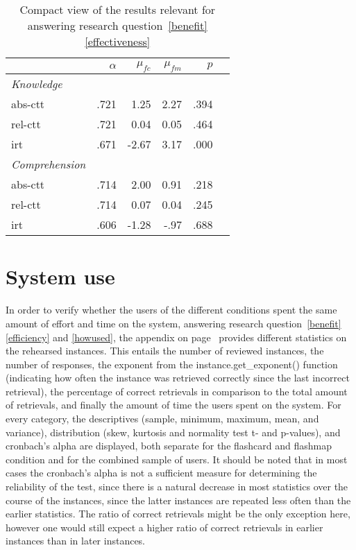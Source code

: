 \begin{table}
    \centering
    \begin{tabular}{lrrrrr}
        \toprule
        & $\alpha$ & $\mu_{fc}$ & $\mu_{fm}$ & $p$ \\
        \midrule
        \emph{Knowledge} &&&& \\
        \midrule
        abs-ctt & .721 & 1.25 & 2.27 & .394 \\
        rel-ctt & .721 & 0.04 & 0.05 & .464 \\
        irt & .671 & -2.67 & 3.17 & .000 \\
        \midrule
        \emph{Comprehension} &&&& \\
        \midrule
        abs-ctt & .714 & 2.00 & 0.91 & .218 \\
        rel-ctt & .714 & 0.07 & 0.04 & .245\\
        irt & .606 & -1.28 & -.97 & .688 \\
        \bottomrule
    \end{tabular}
    \caption{Compact view of the results relevant for answering research question~\protect\ref{benefit}\protect\ref{effectiveness}}
    \label{tab:learning_gain_effect}
\end{table}

\section{System use}

In order to verify whether the users of the different conditions spent the same amount of effort and time on the system, answering research question~\ref{benefit}\ref{efficiency} and \ref{howused}, the  appendix on page~\pageref{app:instance_stats} provides different statistics on the rehearsed instances. This entails the number of reviewed instances, the number of responses, the exponent from the instance.get\_exponent() function (indicating how often the instance was retrieved correctly since the last incorrect retrieval), the percentage of correct retrievals in comparison to the total amount of retrievals, and finally the amount of time the users spent on the system. For every category, the descriptives (sample, minimum, maximum, mean, and variance), distribution (skew, kurtosis and normality test t- and p-values), and cronbach's alpha are displayed, both separate for the flashcard and flashmap condition and for the combined sample of users. It should be noted that in most cases the cronbach's alpha is not a sufficient measure for determining the reliability of the test, since there is a natural decrease in most statistics over the course of the instances, since the latter instances are repeated less often than the earlier statistics. The ratio of correct retrievals might be the only exception here, however one would still expect a higher ratio of correct retrievals in earlier instances than in later instances. 

